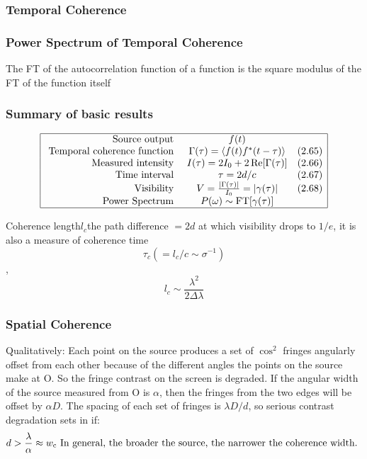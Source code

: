 \documentclass[12pt,a4paper]{article}
\begin{document}
\subsubsection{Temporal Coherence}
\subsubsection{Power Spectrum of Temporal Coherence}
    {The FT of the autocorrelation function of a function is the square modulus of the FT of the function itself}
\subsubsection{Summary of basic results}
$$
\begin{array}{|rcr|}
\hline \text { Source output } & f(t) & \\
\text { Temporal coherence function } & \Gamma(\tau)=\left\langle f(t) f^*(t-\tau)\right\rangle & (2.65) \\
\text { Measured intensity } & I(\tau)=2 I_0+2 \Re[\Gamma(\tau)] & (2.66) \\
\text { Time interval } & \tau=2 d / c & (2.67) \\
\text { Visibility } & V=\frac{|\Gamma(\tau)|}{I_0}=|\gamma(\tau)| & (2.68) \\
\text { Power Spectrum } & P(\omega) \sim \mathrm{FT}[\gamma(\tau)] & \\
\hline
\end{array}
$$

\begin{definition}
    {Coherence length}{$l_c$}{the path difference $= 2d$ at which visibility drops to $1/e$, it is also a measure of coherence time
    $$
    \tau_c\left(=l_c / c \sim \sigma^{-1}\right)
    $$,$$l_c \sim \frac{\lambda^2}{2 \Delta \lambda}$$}
\end{definition}

\subsubsection{Spatial Coherence}
Qualitatively: Each point on the source produces a set of $\cos ^2$ fringes angularly offset from each other because of the different angles the points on the source make at O. So the fringe contrast on the screen is degraded.
If the angular width of the source measured from $\mathrm{O}$ is $\alpha$, then the fringes from the two edges will be offset by $\alpha D$. The spacing of each set of fringes is $\lambda D / d$, so serious contrast degradation sets in if:
$$
d>\frac{\lambda}{\alpha} \approx w_{\mathrm{c}}\\
\text { In general, the broader the source, the narrower the coherence width. }
$$
\end{document}
